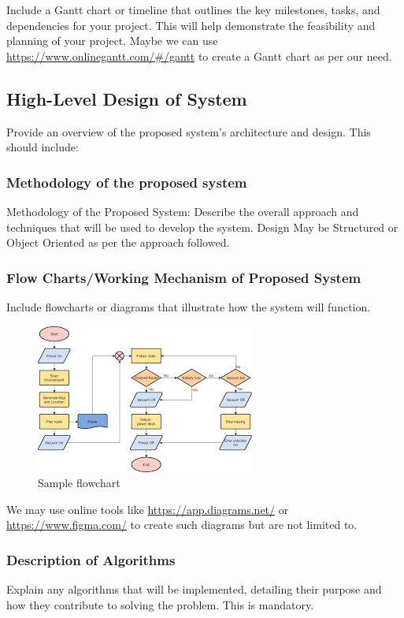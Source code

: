 Include a Gantt chart or timeline that outlines the key milestones, tasks, and dependencies for your project. This will help demonstrate the feasibility and planning of your project. Maybe we can use \url{https://www.onlinegantt.com/#/gantt} to create a Gantt chart as per our need.
  
\subsection{High-Level Design of System}
Provide an overview of the proposed system's architecture and design. This should include:

\subsubsection{Methodology of the proposed system}
Methodology of the Proposed System: Describe the overall approach and techniques that will be used to develop the system. Design May be Structured or Object Oriented as per the approach followed.

\subsubsection{Flow Charts/Working Mechanism of Proposed System}
Include flowcharts or diagrams that illustrate how the system will function.

\begin{figure}[H]
    \centering
    \includegraphics[width=0.5\linewidth]{Images/flow.png}
    \caption{Sample flowchart}
    \label{fig:enter-label}
\end{figure}

We may use online tools like \url{https://app.diagrams.net/} or \url{https://www.figma.com/} to create such diagrams but are not limited to.

\subsubsection{Description of Algorithms}
Explain any algorithms that will be implemented, detailing their purpose and how they contribute to solving the problem. This is mandatory.
